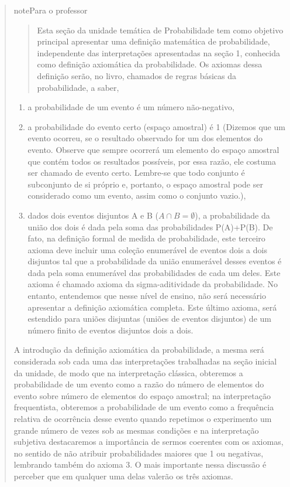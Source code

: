 \begin{quote}

\begin{sphinxadmonition}{note}{Para o professor}
\begin{quote}

Esta seção da unidade temática de Probabilidade tem como objetivo principal apresentar uma definição matemática de probabilidade, independente das interpretações apresentadas na seção 1, conhecida como definição axiomática da probabilidade. Os axiomas dessa definição serão, no livro, chamados de regras básicas da probabilidade, a saber,
\end{quote}
\begin{enumerate}
\item {} 
a probabilidade de um evento é um número não-negativo,

\item {} 
a probabilidade do evento certo (espaço amostral) é 1 (Dizemos que um evento ocorreu, se o resultado observado for um dos elementos do evento. Observe que sempre ocorrerá um elemento do espaço amostral que contém todos os resultados possíveis, por essa razão, ele costuma ser chamado de evento certo. Lembre-se que todo conjunto é subconjunto de si próprio e, portanto, o espaço amostral pode ser considerado como um evento, assim como o conjunto vazio.),

\item {} 
dados dois eventos disjuntos A e B (\(A\cap B=\emptyset\)), a probabilidade da união dos dois é dada pela soma das probabilidades P(A)+P(B). De fato, na definição formal de medida de probabilidade, este terceiro axioma deve incluir uma coleção enumerável de eventos dois a dois disjuntos tal que a probabilidade da união enumerável desses eventos é dada pela soma enumerável das probabilidades de cada um deles. Este axioma é chamado axioma da sigma-aditividade da probabilidade. No entanto, entendemos que nesse nível de ensino, não será necessário apresentar a definição axiomática completa. Este último axioma, será estendido para uniões disjuntas (uniões de eventos disjuntos) de um número finito de eventos disjuntos dois a dois.

\end{enumerate}

A introdução da definição axiomática da probabilidade, a mesma será considerada sob cada uma das interpretações trabalhadas na seção inicial da unidade, de modo que na interpretação clássica, obteremos a probabilidade de um evento como a razão do número de elementos do evento sobre número de elementos do espaço amostral; na interpretação frequentista, obteremos a probabilidade de um evento como a frequência relativa de ocorrência desse evento quando repetimos o experimento um grande número de vezes sob as mesmas condições e na interpretação subjetiva destacaremos a importância de sermos coerentes com os axiomas, no sentido de não atribuir probabilidades maiores que 1 ou negativas, lembrando também do axioma 3. O mais importante nessa discussão é perceber que em qualquer uma delas valerão os três axiomas.


\end{sphinxadmonition}
\end{quote}
